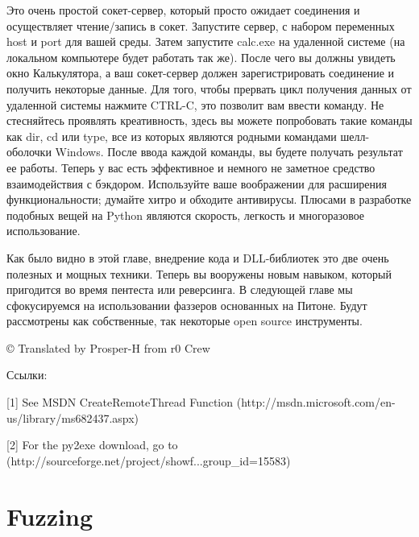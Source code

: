 \documentclass[12pt]{book}
\begin{document}


Это очень простой сокет-сервер, который просто ожидает соединения и осуществляет чтение/запись в сокет. Запустите сервер, с набором переменных host и port для вашей среды. Затем запустите calc.exe на удаленной системе (на локальном компьютере будет работать так же). После чего вы должны увидеть окно Калькулятора, а ваш сокет-сервер должен зарегистрировать соединение и получить некоторые данные. Для того, чтобы прервать цикл получения данных от удаленной системы нажмите CTRL-C, это позволит вам ввести команду. Не стесняйтесь проявлять креативность, здесь вы можете попробовать такие команды как dir, cd или type, все из которых являются родными командами шелл-оболочки Windows. После ввода каждой команды, вы будете получать результат ее работы. Теперь у вас есть эффективное и немного не заметное средство взаимодействия с бэкдором. Используйте ваше воображении для расширения функциональности; думайте хитро и обходите антивирусы. Плюсами в разработке подобных вещей на Python являются скорость, легкость и многоразовое использование.

Как было видно в этой главе, внедрение кода и DLL-библиотек это две очень полезных и мощных техники. Теперь вы вооружены новым навыком, который пригодится во время пентеста или реверсинга. В следующей главе мы сфокусируемся на использовании фаззеров основанных на Питоне. Будут рассмотрены как собственные, так некоторые open source инструменты.


© Translated by Prosper-H from r0 Crew


Ссылки:

[1] See MSDN CreateRemoteThread Function (http://msdn.microsoft.com/en-us/library/ms682437.aspx)

[2] For the py2exe download, go to (http://sourceforge.net/project/showf...group\_id=15583)

\chapter{Fuzzing}
\end{document}
